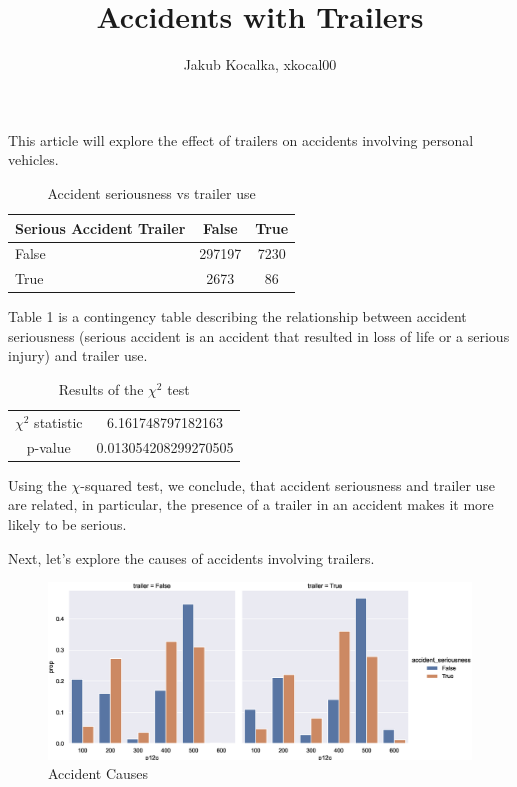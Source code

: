\documentclass[10pt,a4paper]{article}
\author{Jakub Kocalka, xkocal00}
\title{Accidents with Trailers}
\begin{document}
	\maketitle
	
	This article will explore the effect of trailers on accidents involving personal vehicles.
	
	\begin{table}[h]
		\centering
		\begin{tabular}{p{27mm}|cc|}
			Serious Accident \newline Trailer & False & True \\
			\hline 
			False & 297197 & 7230 \\ 
			True & 2673 & 86 \\ 
		\end{tabular}
		\caption{Accident seriousness vs trailer use}
		\label{tab:cross}
	\end{table}

	Table 1 is a contingency table describing the relationship between accident seriousness (serious accident is an accident that resulted in loss of life or a serious injury) and trailer use.
	
	\begin{table}[h]
		\centering
		\begin{tabular}{c|c}
			$\chi^2$ statistic & 6.161748797182163\\
			p-value & 0.013054208299270505\\
		\end{tabular}
		\caption{Results of the $\chi^2$ test}
		\label{tab:chi_result}
	\end{table}
	
	Using the $\chi$-squared test, we conclude, that accident seriousness and trailer use are related, in particular, the presence of a trailer in an accident makes it more likely to be serious.
	
	Next, let's explore the causes of accidents involving trailers.
	
	\begin{figure}
		\includegraphics[width=\textwidth]{fig.eps}
		\caption{Accident Causes}
		\label{fig:causes}
	\end{figure}
	 
	
\end{document}
